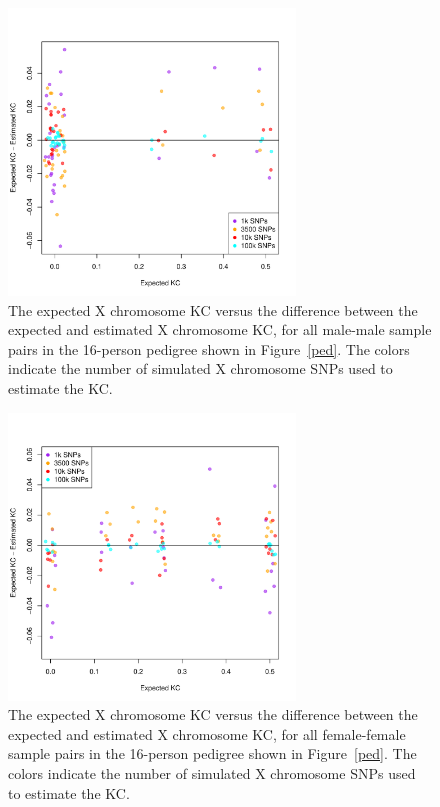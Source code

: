 \documentclass[11pt]{article} %
\begin{document}
\begin{figure}
\begin{center}
\includegraphics[height=3in]{xchrKcEstimatedVsTrueMM.pdf}
\caption{The expected X chromosome KC versus the difference between the expected and estimated X chromosome KC, for all male-male sample pairs in the 16-person pedigree shown in Figure~\ref{ped}. The colors indicate the number of simulated X chromosome SNPs used to estimate the KC.}
\label{xchr_relatedness_M}
\end{center}
\end{figure}

\begin{figure}
\begin{center}
\includegraphics[height=3in]{xchrKcEstimatedVsTrueFF.pdf}
\caption{The expected X chromosome KC versus the difference between the expected and estimated X chromosome KC, for all female-female sample pairs in the 16-person pedigree shown in Figure~\ref{ped}. The colors indicate the number of simulated X chromosome SNPs used to estimate the KC.}
\label{xchr_relatedness_F}
\end{center}
\end{figure}
\end{document}
